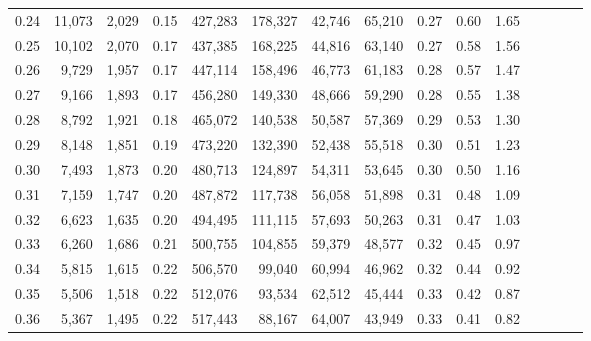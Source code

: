 \begin{tabular}{rrrcrrrrrrrrrrr}
0.24 &  11,073 &  2,029 &                                       0.15 &  427,283 &  178,327 &   42,746 &   65,210 &  0.27 &  0.60 &                         1.65 \\
0.25 &  10,102 &  2,070 &                                       0.17 &  437,385 &  168,225 &   44,816 &   63,140 &  0.27 &  0.58 &                         1.56 \\
0.26 &   9,729 &  1,957 &                                       0.17 &  447,114 &  158,496 &   46,773 &   61,183 &  0.28 &  0.57 &                         1.47 \\
0.27 &   9,166 &  1,893 &                                       0.17 &  456,280 &  149,330 &   48,666 &   59,290 &  0.28 &  0.55 &                         1.38 \\
0.28 &   8,792 &  1,921 &                                       0.18 &  465,072 &  140,538 &   50,587 &   57,369 &  0.29 &  0.53 &                         1.30 \\
0.29 &   8,148 &  1,851 &                                       0.19 &  473,220 &  132,390 &   52,438 &   55,518 &  0.30 &  0.51 &                         1.23 \\
0.30 &   7,493 &  1,873 &                                       0.20 &  480,713 &  124,897 &   54,311 &   53,645 &  0.30 &  0.50 &                         1.16 \\
0.31 &   7,159 &  1,747 &                                       0.20 &  487,872 &  117,738 &   56,058 &   51,898 &  0.31 &  0.48 &                         1.09 \\
0.32 &   6,623 &  1,635 &                                       0.20 &  494,495 &  111,115 &   57,693 &   50,263 &  0.31 &  0.47 &                         1.03 \\
0.33 &   6,260 &  1,686 &                                       0.21 &  500,755 &  104,855 &   59,379 &   48,577 &  0.32 &  0.45 &                         0.97 \\
0.34 &   5,815 &  1,615 &                                       0.22 &  506,570 &   99,040 &   60,994 &   46,962 &  0.32 &  0.44 &                         0.92 \\
0.35 &   5,506 &  1,518 &                                       0.22 &  512,076 &   93,534 &   62,512 &   45,444 &  0.33 &  0.42 &                         0.87 \\
0.36 &   5,367 &  1,495 &                                       0.22 &  517,443 &   88,167 &   64,007 &   43,949 &  0.33 &  0.41 &                         0.82 \\

\end{tabular}
